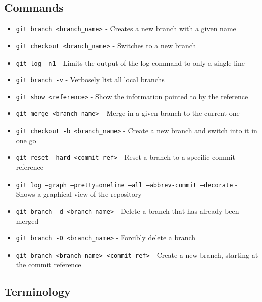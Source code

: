 \subsection{Commands}
\begin{itemize}
\item\texttt{git branch <branch\_name>} - Creates a new branch with a given name

\item\texttt{git checkout <branch\_name>} - Switches to a new branch

\item\texttt{git log -n1} - Limits the output of the log command to only a single line

\item\texttt{git branch -v} - Verbosely list all local branchs

\item\texttt{git show <reference>} - Show the information pointed to by the reference

\item\texttt{git merge <branch\_name>} - Merge in a given branch to the current one

\item\texttt{git checkout -b <branch\_name>} - Create a new branch and switch into it in one go

\item\texttt{git reset --hard <commit\_ref>} - Reset a branch to a specific commit reference

\item\texttt{git log --graph --pretty=oneline --all --abbrev-commit --decorate} - Shows a graphical view of the repository

\item\texttt{git branch -d <branch\_name>} - Delete a branch that has already been merged

\item\texttt{git branch -D <branch\_name>} - Forcibly delete a branch

\item\texttt{git branch <branch\_name> <commit\_ref>} - Create a new branch, starting at the commit reference

\end{itemize}

\subsection{Terminology}


